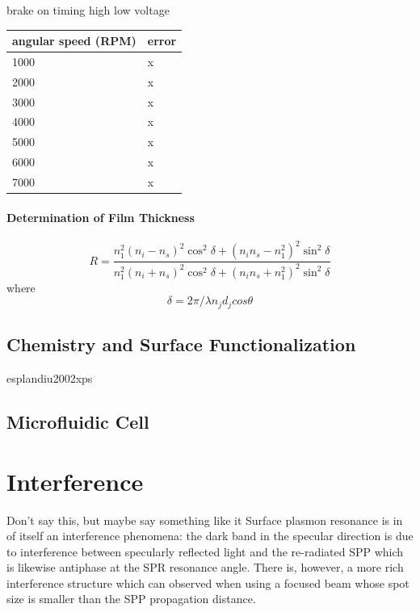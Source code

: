 \documentclass[a4paper,titlepage,onecolumn]{report}
\begin{document}
brake on
timing  high
low voltage

\begin{table}
 \begin{tabular}{ll}
  \toprule
  angular speed (RPM) & error \\
  \midrule
  1000 & x \\
  2000 & x \\
  3000 & x \\
  4000 & x \\
  5000 & x \\
  6000 & x \\
  7000 & x \\
  \bottomrule
 \end{tabular}
 \label{tbl:spincoatererror}
\end{table}

\subsubsection{Determination of Film Thickness}
\begin{equation}
 R = \frac{n_1^2(n_i-n_s)^2 \cos^2\delta + (n_i n_s - n_1^2)^2\sin^2\delta}
          {n_1^2(n_i+n_s)^2 \cos^2\delta + (n_i n_s + n_1^2)^2\sin^2\delta}
\end{equation}
where
\begin{equation}
\delta = 2\pi/\lambda n_j d_j cos \theta
\end{equation}


\section{Chemistry and Surface Functionalization}
esplandiu2002xps

\section{Microfluidic Cell}

\chapter{Interference}
Don't say this, but maybe say something like it
Surface plasmon resonance is in of itself an interference phenomena: the dark band in the specular direction is due to interference between
specularly reflected light and the re-radiated SPP which is likewise
antiphase at the SPR resonance angle.  There is, however, a more rich 
interference structure which can observed when using a focused beam whose spot size is smaller than the SPP propagation distance.  
\end{document}
